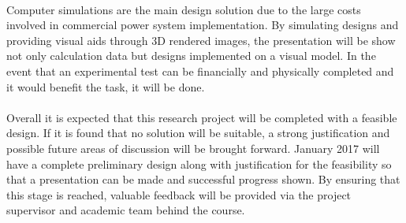 \paragraph{}
Computer simulations are the main design solution due to the large costs involved in commercial power system implementation. By simulating designs and providing visual aids through 3D rendered images, the presentation will be show not only calculation data but designs implemented on a visual model. In the event that an experimental test can be financially and physically completed and it would benefit the task, it will be done.    

\paragraph{}
Overall it is expected that this research project will be completed with a feasible design. If it is found that no solution will be suitable, a strong justification and possible future areas of discussion will be brought forward. January 2017 will have a complete preliminary design along with justification for the feasibility so that a presentation can be made and successful progress shown. By ensuring that this stage is reached, valuable feedback will be provided via the project supervisor and academic team behind the course. 
\newpage